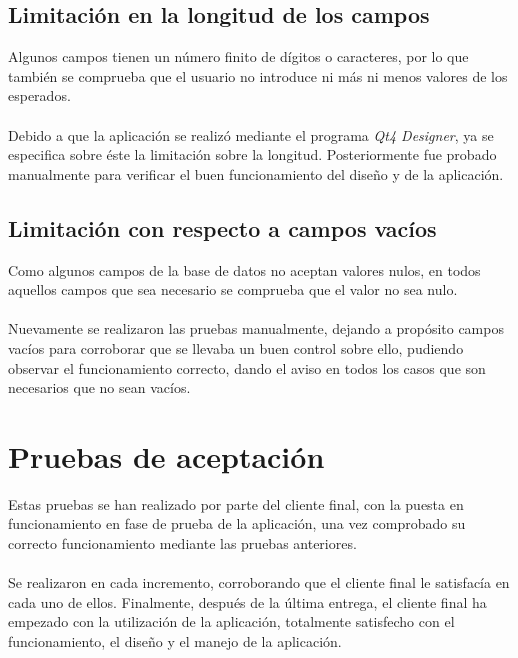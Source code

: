 \subsection{Limitación en la longitud de los campos}
Algunos campos tienen un número finito de dígitos o caracteres, por lo que también se comprueba que el usuario no introduce ni más ni menos valores de los esperados.\\\\
Debido a que la aplicación se realizó mediante el programa \textit{Qt4 Designer}, ya se especifica sobre éste la limitación sobre la longitud. Posteriormente fue probado manualmente para verificar el buen funcionamiento del diseño y de la aplicación.

\subsection{Limitación con respecto a campos vacíos}
Como algunos campos de la base de datos no aceptan valores nulos, en todos aquellos campos que sea necesario se comprueba que el valor no sea nulo.\\\\
Nuevamente se realizaron las pruebas manualmente, dejando a propósito campos vacíos para corroborar que se llevaba un buen control sobre ello, pudiendo observar el funcionamiento correcto, dando el aviso en todos los casos que son necesarios que no sean vacíos.

\section{Pruebas de aceptación}
Estas pruebas se han realizado por parte del cliente final, con la puesta en funcionamiento en fase de prueba de la aplicación, una vez comprobado su correcto funcionamiento mediante las pruebas anteriores.\\\\
Se realizaron en cada incremento, corroborando que el cliente final le satisfacía en cada uno de ellos. Finalmente, después de la última entrega, el cliente final ha empezado con la utilización de la aplicación, totalmente satisfecho con el funcionamiento, el diseño y el manejo de la aplicación.
